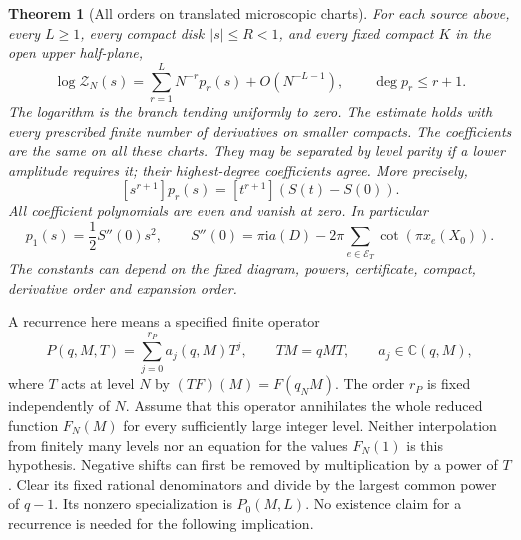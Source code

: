 \documentclass[11pt]{article}
\numberwithin{equation}{section}
\newtheorem{theorem}{Theorem}[section]
\theoremstyle{definition}\newtheorem{definition}[theorem]{Definition}
\newcommand{\ii}{\mathrm i}
\newcommand{\Z}{\mathcal Z}
\begin{document}
\begin{theorem}[All orders on translated microscopic charts]
\label{me:all-orders}
For each source above, every $L\ge1$, every compact disk
$|s|\le R<1$, and every fixed compact $K$ in the open upper
half-plane,
\begin{equation}\label{me:expansion}
 \log\Z_N(s)=\sum_{r=1}^L N^{-r}p_r(s)+O(N^{-L-1}),
 \qquad \deg p_r\le r+1.
\end{equation}
The logarithm is the branch tending uniformly to zero. The estimate
holds with every prescribed finite number of derivatives on smaller
compacts. The coefficients are the same on all these charts. They
may be separated by level parity if a lower amplitude requires it;
their highest-degree coefficients agree. More precisely,
\begin{equation}\label{me:diagonal}
 [s^{r+1}]p_r(s)=[t^{r+1}](S(t)-S(0)).
\end{equation}
All coefficient polynomials are even and vanish at zero. In particular
\begin{equation}\label{me:first-coefficient}
 p_1(s)=\frac12S''(0)s^2,\qquad
 S''(0)=\pi\ii a(D)-2\pi\sum_{e\in\mathcal E_T}\cot(\pi x_e(X_0)).
\end{equation}
The constants can depend on the fixed diagram, powers, certificate,
compact, derivative order and expansion order.
\end{theorem}

A recurrence here means a specified finite operator
\begin{equation}\label{me:operator}
 P(q,M,T)=\sum_{j=0}^{r_P}a_j(q,M)T^j,\qquad TM=qMT,
 \qquad a_j\in\mathbb C(q,M),
\end{equation}
where $T$ acts at level $N$ by $(TF)(M)=F(q_NM)$. The order
$r_P$ is fixed independently of $N$. Assume that this operator
annihilates the whole reduced function $F_N(M)$ for every
sufficiently large integer level. Neither interpolation from finitely
many levels nor an equation for the values $F_N(1)$ is this hypothesis.
Negative shifts can first be removed by multiplication by a power
of $T$. Clear its fixed rational denominators and divide by the
largest common power of $q-1$. Its nonzero specialization is
$P_0(M,L)$. No existence claim for a recurrence is needed for the
following implication.
\end{document}
